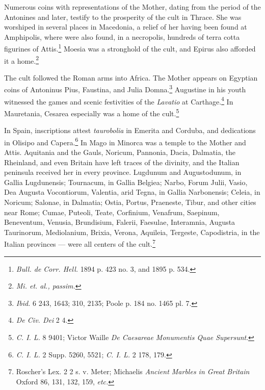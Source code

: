 \documentclass[a4paper, 11pt, oneside, polutonikogreek, english]{article}
\begin{document}
Numerous coins with representations of the Mother, dating from the period of the Antonines and later, testify to the prosperity of the cult in Thrace. She was worshiped in several places in Macedonia, a relief of her having been found at Amphipolis, where were also found, in a necropolis, hundreds of terra cotta figurines of Attis.\footnote{\emph{Bull. de Corr. Hell.} 1894 p. 423 no. 3, and 1895 p. 534.} Moesia was a stronghold of the cult, and Epirus also afforded it a home.\footnote{\emph{Mi. et. al., passim.}}

The cult followed the Roman arms into Africa. The Mother appears on Egyptian coins of Antoninus Pius, Faustina, and Julia Domna.\footnote{\emph{Ibid.} 6 243, 1643; 310, 2135; Poole p. 184 no. 1465 pl. 7.} Augustine in his youth witnessed the games and scenic festivities of the \emph{Lavatio} at Carthage.\footnote{\emph{De Civ. Dei} 2 4.} In Mauretania, Cesarea especially was a home of the cult.\footnote{\emph{C. I. L.} 8 9401; Victor Waille \emph{De Caesareae Monumentis Quae Supersunt}.}

In Spain, inscriptions attest \emph{taurobolia} in Emerita and Corduba, and dedications in Olisipo and Capera.\footnote{\emph{C. I. L.} 2 Supp. 5260, 5521; \emph{C. I. L.} 2 178, 179.} In Mago in Minorca was a temple to the Mother and Attis. Aquitania and the Gauls, Noricum, Pannonia, Dacia, Dalmatia, the Rheinland, and even Britain have left traces of the divinity, and the Italian peninsula received her in every province. Lugdunum and Augustodunum, in Gallia Lugdunensis; Tournacum, in Gallia Belgiea; Narbo, Forum Julii, Vasio, Dea Augusta Vocontiorum, Valentia, arid Tegna, in Gallia Narbonensis; Celeia, in Noricum; Salonae, in Dalmatia; Ostia, Portus, Praeneste, Tibur, and other cities near Rome; Cumae, Puteoli, Teate, Corfinium, Venafrum, Saepinum, Beneventum, Venusia, Brundisium, Falerii, Faesulae, Interamnia, Augusta Taurinorum, Mediolanium, Brixia, Verona, Aquileia, Tergeste, Capodistria, in the Italian provinces --- were all centers of the cult.\footnote{Roscher's Lex. 2 2 s. v. Meter; Michaelis \emph{Ancient Marbles in Great Britain} Oxford 86, 131, 132, 159, \emph{etc.}}
\end{document}
